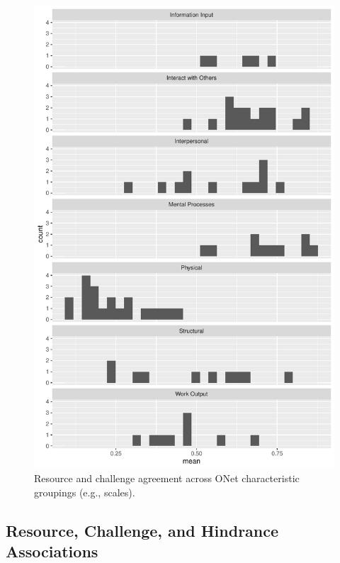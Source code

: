 \documentclass[
  man]{apa6}
\begin{document}
\begin{figure}
\centering
\includegraphics{SIOP2024convergence_files/figure-latex/recchall-1.pdf}
\caption{\label{fig:recchall}Resource and challenge agreement across ONet characteristic groupings (e.g., scales).}
\end{figure}

\hypertarget{resource-challenge-and-hindrance-associations}{%
\subsection{Resource, Challenge, and Hindrance Associations}\label{resource-challenge-and-hindrance-associations}}
\end{document}
